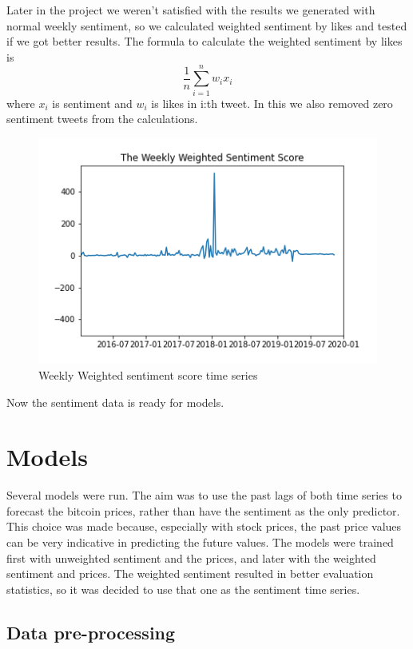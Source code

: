 \documentclass{article}
\begin{document}
Later in the project we weren't satisfied with the results we generated with normal weekly sentiment, so we calculated weighted sentiment by likes and tested if we got better results. The formula to calculate the weighted sentiment by likes is 
\[\frac{1}{n}\sum_{i=1}^{n}w_ix_i\] where $x_i$ is sentiment and $w_i$ is likes in i:th tweet. In this we also removed zero sentiment tweets from the calculations.

\begin{figure}[h]
    \centering
    \includegraphics[scale=0.75]{WeeklyWeightedSentiment.png}
    \caption{Weekly Weighted sentiment score time series}
    \label{fig:my_label}
\end{figure}


Now the sentiment data is ready for models. 

\section{Models}

Several models were run. The aim was to use the past lags of both time series to forecast the bitcoin prices, rather than have the sentiment as the only predictor. This choice was made because, especially with stock prices, the past price values can be very indicative in predicting the future values. The models were trained first with unweighted sentiment and the prices, and later with the weighted sentiment and prices. The weighted sentiment resulted in better evaluation statistics, so it was decided to use that one as the sentiment time series. 
\subsection{Data pre-processing}
\end{document}
